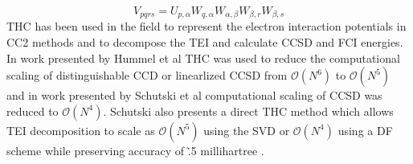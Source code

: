 			\begin{equation}
				V_{pqrs} = U_{p, \alpha} W_{q, \alpha} W_{\alpha, \beta} W_{\beta, r} W_{\beta, s}
			\end{equation}
		THC has been used in the field to represent the electron interaction potentials in CC2 methods and to decompose the TEI and calculate CCSD and FCI energies. In work presented by Hummel et al \cite{Hummel} THC was used to reduce the computational scaling of distinguishable CCD or linearlized CCSD from $\mathcal{O}(N^6)$ to $\mathcal{O}(N^5)$ and in work presented by Schutski et al\cite{Schutski} computational scaling of CCSD was reduced to $\mathcal{O}(N^4)$.  Schutski also presents a direct THC method which allows TEI decomposition to scale as $\mathcal{O}(N^5)$ using the SVD or $\mathcal{O}(N^4)$ using a DF scheme while preserving accuracy of \~.5 millihartree .
